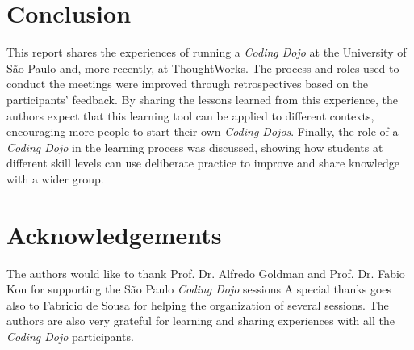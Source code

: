 \section{Conclusion}\label{sec:conclusion}

This report shares the experiences of running a \emph{Coding Dojo} at
the University of São Paulo and, more recently, at ThoughtWorks. The
process and roles used to conduct the meetings were improved through
retrospectives based on the participants' feedback. By sharing the
lessons learned from this experience, the authors expect that this
learning tool can be applied to different contexts, encouraging more
people to start their own \emph{Coding Dojos}. Finally, the role of a
\emph{Coding Dojo} in the learning process was discussed, showing how
students at different skill levels can use deliberate practice to
improve and share knowledge with a wider group.

\section*{Acknowledgements}

The authors would like to thank Prof. Dr. Alfredo Goldman and
Prof. Dr. Fabio Kon for supporting the São Paulo \emph{Coding Dojo}
sessions %
A special thanks goes
also to Fabricio de Sousa for helping the organization of several
sessions. %
The authors are also very grateful for learning
and sharing experiences with all the \emph{Coding Dojo} participants.
